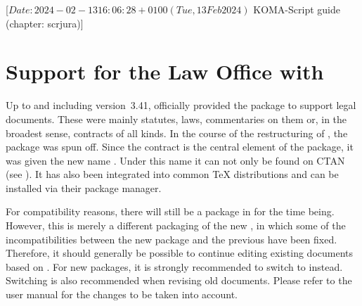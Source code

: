 %
%
%
%
%
%
%

%
                 [$Date: 2024-02-13 16:06:28 +0100 (Tue, 13 Feb 2024) $
                  KOMA-Script guide (chapter: scrjura)]


\chapter{Support for the Law Office with }
\BeginIndexGroup
{}

Up to and including version~3.41, \KOMAScript{} officially provided the
package  to support legal documents. These were mainly
statutes, laws, commentaries on them or, in the broadest sense, contracts of
all kinds. In the course of the restructuring of \KOMAScript{}, the package
was spun off. Since the contract is the central element of the package, it was
given the new name . Under this name it can not only be
found on CTAN (see \cite{package:contract}). It has also been integrated into
common \TeX{} distributions and can be installed via their package manager.

For compatibility reasons, there will still be a package  in
\KOMAScript{} for the time being. However, this is merely a different
packaging of the new , in which some of the
incompatibilities between the new package and the previous 
have been fixed. Therefore, it should generally be possible to continue
editing existing documents based on . For new packages, it is
strongly recommended to switch to  instead. Switching is
also recommended when revising old documents. Please refer to the
 user manual for the changes to be taken into account.

